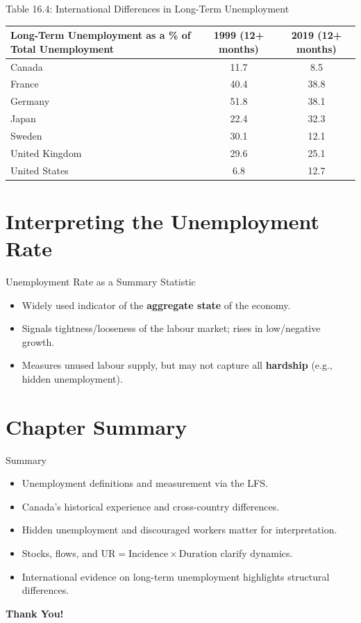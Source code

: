 \documentclass[aspectratio=169]{beamer}
\begin{document}
\begin{frame}{Table 16.4: International Differences in Long-Term Unemployment}
\transfade
\scriptsize
\begin{tabular}{lcc}
\toprule
\textbf{Long-Term Unemployment as a \% of Total Unemployment} & \textbf{1999 (12+ months)} & \textbf{2019 (12+ months)} \\
\midrule
Canada & 11.7 & 8.5 \\
France & 40.4 & 38.8 \\
Germany & 51.8 & 38.1 \\
Japan & 22.4 & 32.3 \\
Sweden & 30.1 & 12.1 \\
United Kingdom & 29.6 & 25.1 \\
United States & 6.8 & 12.7 \\
\bottomrule
\end{tabular}
\end{frame}

\section{Interpreting the Unemployment Rate}

\begin{frame}{Unemployment Rate as a Summary Statistic}
\transfade
\begin{itemize}[<+->]
  \item Widely used indicator of the \textbf{aggregate state} of the economy.
  \item Signals tightness/looseness of the labour market; rises in low/negative growth.
  \item Measures unused labour supply, but may not capture all \textbf{hardship} (e.g., hidden unemployment).
\end{itemize}
\end{frame}

\section{Chapter Summary}

\begin{frame}{Summary}
\transfade
\begin{itemize}[<+->]
  \item Unemployment definitions and measurement via the LFS.
  \item Canada’s historical experience and cross-country differences.
  \item Hidden unemployment and discouraged workers matter for interpretation.
  \item Stocks, flows, and $\text{UR} = \text{Incidence} \times \text{Duration}$ clarify dynamics.
  \item International evidence on long-term unemployment highlights structural differences.
\end{itemize}
\end{frame}

\begin{frame}
\centering
\Huge{\textbf{Thank You!}} \\

\end{frame}
\end{document}
